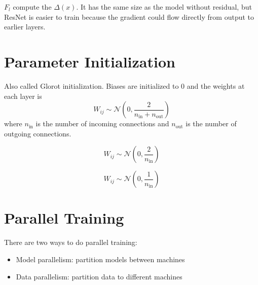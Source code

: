 $F_l$ compute the $\Delta(x)$. It has the same size as the model without residual, but ResNet is easier to train because the gradient could flow directly from output to earlier layers.


\section{Parameter Initialization}

\begin{definition}
    Also called Glorot initialization. Biases are initialized to $0$ and the weights at each layer is
    \begin{equation}
        W_{ij} \sim \mathcal{N}\left(0, \frac{2}{n_{\text{in}} + n_{\text{out}}} \right)
    \end{equation}
    where $n_{\text{in}}$ is the number of incoming connections and $n_{\text{out}}$ is the number of outgoing connections.
\end{definition}

\begin{definition}[He Initialization]
    \begin{equation}
        W_{ij} \sim \mathcal{N}\left(0, \frac{2}{n_{\text{in}}} \right)
    \end{equation}
\end{definition}

\begin{definition}
    \begin{equation}
        W_{ij} \sim \mathcal{N}\left(0, \frac{1}{n_{\text{in}}} \right)
    \end{equation}
\end{definition}



\section{Parallel Training}

There are two ways to do parallel training:
\begin{itemize}
    \item Model parallelism: partition models between machines
    \item Data parallelism: partition data to different machines
\end{itemize}

